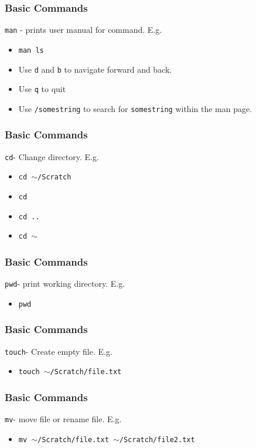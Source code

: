 \documentclass{beamer}
\newcommand{\code}[1]{\colorbox{codegray}{\texttt{#1}}}
\begin{document}
\begin{frame}
\frametitle{Basic Commands}
\code{man} - prints user manual for command. E.g.
\bigskip
\begin{itemize}
    \item \code{man ls}
    \bigskip
    \item Use \code{d} and \code{b} to navigate forward and back.
    \bigskip
    \item Use \code{q} to quit
    \bigskip
    \item Use \code{/somestring} to search for \code{somestring} within the man page.
\end{itemize}
\end{frame}


\begin{frame}
\frametitle{Basic Commands}
\code{cd}- Change directory. E.g.
\bigskip
\begin{itemize}
    \item \code{cd $\sim$/Scratch}
    \bigskip
    \item \code{cd}
    \bigskip
    \item \code{cd ..}
    \bigskip
    \item \code{cd $\sim$} 
\end{itemize}
\end{frame}


\begin{frame}
\frametitle{Basic Commands}
\code{pwd}- print working directory. E.g.
\bigskip
\begin{itemize}
    \item \code{pwd}
\end{itemize}
\end{frame}


\begin{frame}
\frametitle{Basic Commands}
\code{touch}- Create empty file. E.g.
\bigskip
\begin{itemize}
    \item \code{touch $\sim$/Scratch/file.txt}
\end{itemize}
\end{frame}


\begin{frame}
\frametitle{Basic Commands}
\code{mv}- move file or rename file. E.g.
\bigskip
\begin{itemize}
    \item \code{mv $\sim$/Scratch/file.txt $\sim$/Scratch/file2.txt}
\end{itemize}
\end{frame}
\end{document}
